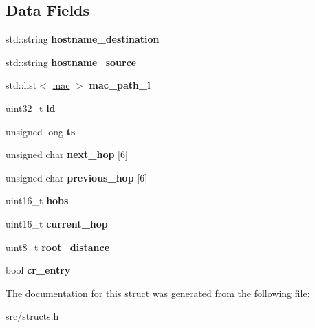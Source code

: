 \subsection*{Data Fields}
\begin{DoxyCompactItemize}
\item 
\hypertarget{structrouting__entry_a241406739cb6984e59f12ab1b523506a}{std\-::string {\bfseries hostname\-\_\-destination}}\label{structrouting__entry_a241406739cb6984e59f12ab1b523506a}

\item 
\hypertarget{structrouting__entry_a131cfb32c1d84f883b79730048597588}{std\-::string {\bfseries hostname\-\_\-source}}\label{structrouting__entry_a131cfb32c1d84f883b79730048597588}

\item 
\hypertarget{structrouting__entry_aa2eeddbcf5fadaacfe71e71b04d69a2c}{std\-::list$<$ \hyperlink{structmac}{mac} $>$ {\bfseries mac\-\_\-path\-\_\-l}}\label{structrouting__entry_aa2eeddbcf5fadaacfe71e71b04d69a2c}

\item 
\hypertarget{structrouting__entry_a87aed279f56da4bb9eb6b84933a9fc77}{uint32\-\_\-t {\bfseries id}}\label{structrouting__entry_a87aed279f56da4bb9eb6b84933a9fc77}

\item 
\hypertarget{structrouting__entry_aa4864549a92479aa74753f1acbbef88d}{unsigned long {\bfseries ts}}\label{structrouting__entry_aa4864549a92479aa74753f1acbbef88d}

\item 
\hypertarget{structrouting__entry_aad5e2cc7e2110927f27d44d9cc41372f}{unsigned char {\bfseries next\-\_\-hop} \mbox{[}6\mbox{]}}\label{structrouting__entry_aad5e2cc7e2110927f27d44d9cc41372f}

\item 
\hypertarget{structrouting__entry_a08d92725236e702d30b11279c1569cc6}{unsigned char {\bfseries previous\-\_\-hop} \mbox{[}6\mbox{]}}\label{structrouting__entry_a08d92725236e702d30b11279c1569cc6}

\item 
\hypertarget{structrouting__entry_a3d36bae4fbf7192dbdd4ced2a4eef634}{uint16\-\_\-t {\bfseries hobs}}\label{structrouting__entry_a3d36bae4fbf7192dbdd4ced2a4eef634}

\item 
\hypertarget{structrouting__entry_aae9850b8704f7a184be5a21335125c99}{uint16\-\_\-t {\bfseries current\-\_\-hop}}\label{structrouting__entry_aae9850b8704f7a184be5a21335125c99}

\item 
\hypertarget{structrouting__entry_a6ad77f5398f8fe97485b72f5f947e319}{uint8\-\_\-t {\bfseries root\-\_\-distance}}\label{structrouting__entry_a6ad77f5398f8fe97485b72f5f947e319}

\item 
\hypertarget{structrouting__entry_a56af04dbe25b1ad2f4f209582911eaec}{bool {\bfseries cr\-\_\-entry}}\label{structrouting__entry_a56af04dbe25b1ad2f4f209582911eaec}

\end{DoxyCompactItemize}


The documentation for this struct was generated from the following file\-:\begin{DoxyCompactItemize}
\item 
src/structs.\-h\end{DoxyCompactItemize}
